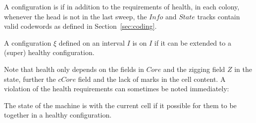 \documentclass[12pt]{memoir}
\newcommand{\authnote}[3]
{{ \textcolor{#3}{$\langle\hspace{-0.2em}\langle$\textsf{\footnotesize #1: #2}$\rangle\hspace{-0.2em}\rangle$}}}
\newcommand{\authnote}[2]{}
\newcommand{\Pnote}[1]{{\authnote{Peter}{#1}{cyan}}}
\newcommand{\Inote}[1]{{\authnote{Ilir}{#1}{blue}}}
\newcommand{\fld}[1]{\ensuremath{\textit{#1}}}
\def\B{B}
\newcommand{\Z}{Z}
\newcommand{\Addr}{\fld{Addr}}
\newcommand{\cAddr}{\fld{cAddr}}
\newcommand{\Core}{\fld{Core}}
\newcommand{\cCore}{\fld{cCore}}
\newcommand{\Info}{\fld{Info}}
\newcommand{\cKind}{\fld{cKind}}
\newcommand{\State}{\fld{State}}
\newcommand{\Sweep}{\fld{Sw}}
\newcommand{\cSweep}{\fld{cSw}}
\begin{document}
 \begin{definition}\label{def:super-healthy}
A configuration is   if in addition to the requirements of health, in each colony,
whenever the head is not in the last sweep,
the \( \Info \) and \( \State \) tracks contain valid codewords as
defined in Section~\ref{sec:coding}.

A configuration \( \xi \) defined on an interval \( I \) is  on \( I \) if 
it can be extended to a (super) healthy configuration.
 \end{definition}

Note that health only depends on the fields in \( \Core \) and
the zigging field \( \Z \) in the state, further the  \( \cCore \) field
and the lack of marks in the cell content.
A violation of the health requirements can sometimes be noted immediately:

\begin{definition}[Coordination] \label{def:coordinated}
   The state of the machine is  with the current cell
   if it possible for them to be together in a healthy configuration.
\end{definition}


    
\end{document}
